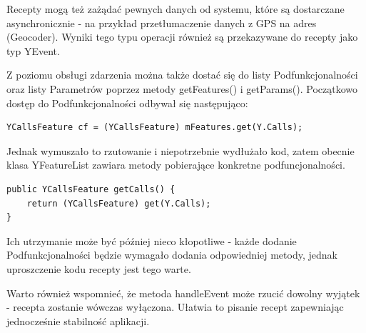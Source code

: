 \documentclass[11pt,a4paper,polish,thesis]{dcsbook}
\begin{document}
Recepty mogą też zażądać pewnych danych od systemu, które są dostarczane asynchronicznie - na przykład przetłumaczenie danych z GPS na adres (Geocoder). Wyniki tego typu operacji również są przekazywane do recepty jako typ YEvent.

Z poziomu obsługi zdarzenia można także dostać się do listy Podfunkcjonalności oraz listy Parametrów poprzez metody getFeatures() i getParams(). Początkowo dostęp do Podfunkcjonalności odbywał się następująco:
\begin{verbatim}
YCallsFeature cf = (YCallsFeature) mFeatures.get(Y.Calls);
\end{verbatim}
Jednak wymuszało to rzutowanie i niepotrzebnie wydłużało kod, zatem obecnie klasa YFeatureList zawiara metody pobierające konkretne podfuncjonalności.
\begin{verbatim}
public YCallsFeature getCalls() {
    return (YCallsFeature) get(Y.Calls);
}
\end{verbatim}
Ich utrzymanie może być później nieco kłopotliwe - każde dodanie Podfunkcjonalności będzie wymagało dodania odpowiedniej metody, jednak uproszczenie kodu recepty jest tego warte.

Warto również wspomnieć, że metoda handleEvent może rzucić dowolny wyjątek - recepta zostanie wówczas wyłączona. Ułatwia to pisanie recept zapewniając jednocześnie stabilność aplikacji.
\end{document}
